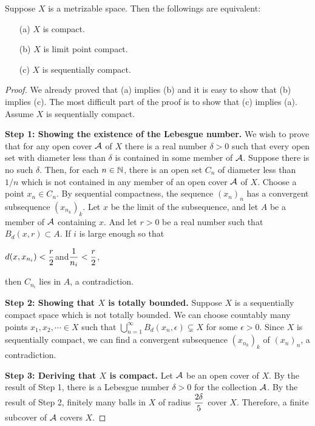 \begin{thm}
    Suppose $X$ is a metrizable space.
    Then the followings are equivalent:
    \begin{enumerate}
        \item[(a)]
        {
            $X$ is compact.
        }
        \item[(b)]
        {
            $X$ is limit point compact.
        }
        \item[(c)]
        {
            $X$ is sequentially compact.
        }
    \end{enumerate}
\end{thm}
\begin{proof}
    We already proved that (a) implies (b) and it is easy to show that (b) implies (c).
    The most difficult part of the proof is to show that (c) implies (a).
    Assume $X$ is sequentially compact.
    
    \textbf{Step 1: Showing the existence of the Lebesgue number.}\newline\indent
    We wish to prove that for any open cover ${\mathcal{A}}$ of $X$ there is a real number $\delta>0$ such that every open set with diameter less than $\delta$ is contained in some member of ${\mathcal{A}}$.
    Suppose there is no such $\delta$.
    Then, for each $n\in{\mathbb{N}}$, there is an open set $C_n$ of diameter less than $1/n$ which is not contained in any member of an open cover ${\mathcal{A}}$ of $X$.
    Choose a point $x_n\in C_n$.
    By sequential compactness, the sequence $(x_n)_n$ has a convergent subsequence $(x_{n_k})_k$.
    Let $x$ be the limit of the subsequence, and let $A$ be a member of ${\mathcal{A}}$ containing $x$.
    And let $r>0$ be a real number such that $B_d(x, r)\subset A$.
    If $i$ is large enough so that
    \begin{center}
        $\displaystyle{d(x, x_{n_i})<\frac{r}{2}}$\quad and\quad$\displaystyle{\frac{1}{n_i}<\frac{r}{2}}$,
    \end{center}
    then $C_{n_i}$ lies in $A$, a contradiction.
    
    \textbf{Step 2: Showing that $X$ is totally bounded.}\newline\indent
    Suppose $X$ is a sequentially compact space which is not totally bounded.
    We can choose countably many points $x_1, x_2, \cdots\in X$ such that $\bigcup_{n=1}^\infty B_d(x_n, \epsilon)\subsetneq X$ for some $\epsilon>0$.
    Since $X$ is sequentially compact, we can find a convergent subsequence $(x_{n_k})_k$ of $(x_n)_n$, a contradiction.
    
    \textbf{Step 3: Deriving that $X$ is compact.}\newline\indent
    Let ${\mathcal{A}}$ be an open cover of $X$.
    By the result of Step 1, there is a Lebesgue number $\delta>0$ for the collection ${\mathcal{A}}$.
    By the result of Step 2, finitely many balls in $X$ of radius $\displaystyle{\frac{2\delta}{5}}$ cover $X$.
    Therefore, a finite subcover of ${\mathcal{A}}$ covers $X$. 
\end{proof}

